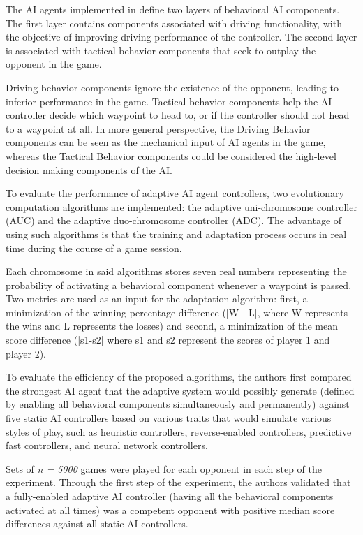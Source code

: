 \documentclass[cic,tc,english]{iiufrgs}
\begin{document}
The AI agents implemented in \cite{article_adaptivebehaviorai} define two layers of behavioral AI components. The first layer contains components associated with driving functionality, with the objective of improving driving performance of the controller. The second layer is associated with tactical behavior components that seek to outplay the opponent in the game.

Driving behavior components ignore the existence of the opponent, leading to inferior performance in the game. Tactical behavior components help the AI controller decide which waypoint to head to, or if the controller should not head to a waypoint at all. In more general perspective, the Driving Behavior components can be seen as the mechanical input of AI agents in the game, whereas the Tactical Behavior components could be considered the high-level decision making components of the AI.

To evaluate the performance of adaptive AI agent controllers, two evolutionary computation algorithms are implemented: the adaptive uni-chromosome controller (AUC) and the adaptive duo-chromosome controller (ADC). The advantage of using such algorithms is that the training and adaptation process occurs in real time during the course of a game session.

Each chromosome in said algorithms stores seven real numbers representing the probability of activating a behavioral component whenever a waypoint is passed. Two metrics are used as an input for the adaptation algorithm: first, a minimization of the winning percentage difference (|W - L|, where W represents the wins and L represents the losses) and second, a minimization of the mean score difference (|s1-s2| where s1 and s2 represent the scores of player 1 and player 2).

To evaluate the efficiency of the proposed algorithms, the authors first compared the strongest AI agent that the adaptive system would possibly generate (defined by enabling all behavioral components simultaneously and permanently) against five static AI controllers based on various traits that would simulate various styles of play, such as heuristic controllers, reverse-enabled controllers, predictive fast controllers, and neural network controllers.

Sets of \emph{n = 5000} games were played for each opponent in each step of the experiment. Through the first step of the experiment, the authors validated that a fully-enabled adaptive AI controller (having all the behavioral components activated at all times) was a competent opponent with positive median score differences against all static AI controllers.
\end{document}
